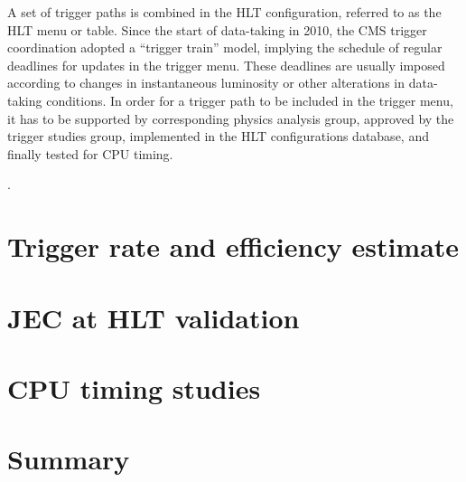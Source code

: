 A set of trigger paths is combined in the HLT configuration, referred to as the HLT menu or table. Since the start of
data-taking in 2010, the CMS trigger coordination adopted a ``trigger train'' model, implying the schedule of regular
deadlines for updates in the trigger menu. These deadlines are usually imposed according to changes in instantaneous
luminosity or other alterations in data-taking conditions. In order for a trigger path to be included in the trigger
menu, it has to be supported by corresponding physics analysis group, approved by the trigger studies group, implemented
in the HLT configurations database, and finally tested for CPU timing.

\cite{HLT_commissioning}.









\section{Trigger rate and efficiency estimate}


\section{JEC at HLT validation}



\section{CPU timing studies}

\section{Summary}




